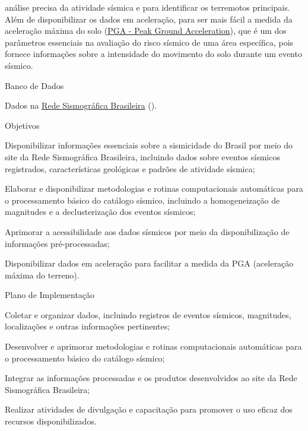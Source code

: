 \documentclass[10pt,a4paper,oneside]{book}
\begin{document}
análise precisa da atividade sísmica e para identificar os terremotos principais. Além de disponibilizar os dados em aceleração, para ser mais fácil a medida da aceleração máxima do solo (\href{https://en.wikipedia.org/wiki/Peak_ground_acceleration}{PGA - Peak Ground Acceleration}), que é um dos parâmetros essenciais na avaliação do risco sísmico de uma área específica, pois fornece informações sobre a intensidade do movimento do solo durante um evento sísmico.

\begin{fancyenum}{\faDatabase}{Banco de Dados}
	\item Dados na \href{http://rsbr.on.br/}{Rede Sismográfica Brasileira} (\faUnlock).
\end{fancyenum}

\begin{fancyenum}{\faFutbol}{Objetivos}
	\item Disponibilizar informações essenciais sobre a sismicidade do Brasil por meio do site da Rede Sismográfica Brasileira, incluindo dados sobre eventos sísmicos registrados, características geológicas e padrões de atividade sísmica;
	\item Elaborar e disponibilizar metodologias e rotinas computacionais automáticas para o processamento básico do catálogo sísmico, incluindo a homogeneização de magnitudes e a declusterização dos eventos sísmicos;
	\item Aprimorar a acessibilidade aos dados sísmicos por meio da disponibilização de informações pré-processadas;
	\item Disponibilizar dados em aceleração para facilitar a medida da PGA (aceleração máxima do terreno).
\end{fancyenum}

\begin{fancyenum}{\faBrain}{Plano de Implementação}
	\item Coletar e organizar dados, incluindo registros de eventos sísmicos, magnitudes, localizações e outras informações pertinentes;
	\item Desenvolver e aprimorar metodologias e rotinas computacionais automáticas para o processamento básico do catálogo sísmico;
	\item Integrar as informações processadas e os produtos desenvolvidos ao site da Rede Sismográfica Brasileira;
	\item Realizar atividades de divulgação e capacitação para promover o uso eficaz dos recursos disponibilizados.
\end{fancyenum}
\end{document}
